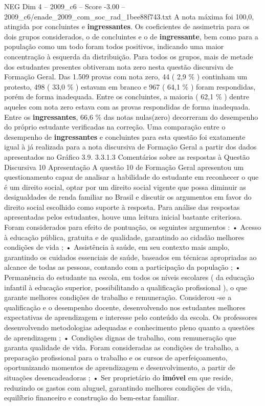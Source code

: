 \begin{textsample}{NEG Dim 4 – 2009\_c6 – Score -3.00 – 2009\_c6/enade\_2009\_com\_soc\_rad\_1bee88f743.txt}
A nota máxima foi 100,0, atingida por concluintes e \textbf{ingressantes}.
Os coeficientes de assimetria para os dois grupos considerados, o de concluintes e o de \textbf{ingressante}, bem como para a população como um todo foram todos positivos, indicando uma maior concentração à esquerda da distribuição.
Para todos os grupos, mais de metade dos estudantes presentes obtiveram nota zero nesta questão discursiva de Formação Geral.
Das 1.509 provas com nota zero, 44 ( 2,9 \% ) continham um protesto, 498 ( 33,0 \% ) estavam em branco e 967 ( 64,1 \% ) foram respondidas, porém de forma inadequada.
Entre os concluintes, a maioria ( 62,1 \% ) dentre aqueles com nota zero estava com as provas respondidas de forma inadequada.
Entre os \textbf{ingressantes}, 66,6 \% das notas nulas(zero) decorreram do desempenho do próprio estudante verificadas na correção.
Uma comparação entre o desempenho de \textbf{ingressantes} e concluintes para esta questão foi exatamente igual à já realizada para a nota discursiva de Formação Geral a partir dos dados apresentados no Gráfico 3.9. 3.3.1.3 Comentários sobre as respostas à Questão Discursiva 10 Apresentação A questão 10 de Formação Geral apresentou um questionamento capaz de analisar a habilidade do estudante em reconhecer o que é um direito social, optar por um direito social vigente que possa diminuir as desigualdades de renda familiar no Brasil e discutir os argumentos em favor do direito social escolhido como suporte à resposta.
Para análise das respostas apresentadas pelos estudantes, houve uma leitura inicial bastante criteriosa.
Foram considerados para efeito de pontuação, os seguintes argumentos : • Acesso à educação pública, gratuita e de qualidade, garantindo ao cidadão melhores condições de vida ; • Assistência à saúde, em seu contexto mais amplo, garantindo os cuidados essenciais de saúde, baseados em técnicas apropriadas ao alcance de todas as pessoas, contando com a participação da população ; • Permanência do estudante na escola, em todos os níveis escolares ( da educação infantil à educação superior, possibilitando a qualificação profissional ), o que garante melhores condições de trabalho e remuneração.
Considerou -se a qualificação e o desempenho docente, desenvolvendo nos estudantes melhores expectativas de aprendizagem e interesse pelo conteúdo da escola.
Os professores desenvolvendo metodologias adequadas e conhecimento pleno quanto a questões de aprendizagem ; • Condições dignas de trabalho, com remuneração que garanta qualidade de vida.
Foram consideradas as condições de trabalho, a preparação profissional para o trabalho e os cursos de aperfeiçoamento, oportunizando momentos de aprendizagem e desenvolvimento, a partir de situações desencadeadoras ; • Ser proprietário do \textbf{imóvel} em que reside, reduzindo os gastos com aluguel, garantindo melhores condições de vida, equilíbrio financeiro e construção do bem-estar familiar.

\end{textsample}
